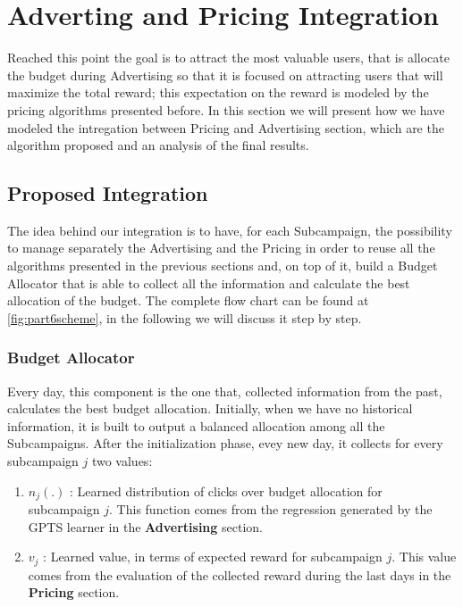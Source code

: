 \chapter{Adverting and Pricing Integration}

Reached this point the goal is to attract the most valuable users, that is allocate the budget during Advertising so that it is focused on attracting users that will maximize the total reward; this expectation on the reward is modeled by the pricing algorithms presented before. In this section we will present how we have modeled the intregation between Pricing and Advertising section, which are the algorithm proposed and an analysis of the final results.

\section{Proposed Integration}
The idea behind our integration is to have, for each Subcampaign, the possibility to manage separately the Advertising and the Pricing in order to reuse all the algorithms presented in the previous sections and, on top of it, build a Budget Allocator that is able to collect all the information and calculate the best allocation of the budget. The complete flow chart can be found at \ref{fig:part6scheme}, in the following we will discuss it step by step.

    \subsection{Budget Allocator}
    Every day, this component is the one that, collected information from the past, calculates the best budget allocation. Initially, when we have no historical information, it is built to output a balanced allocation among all the Subcampaigns. After the initialization phase, evey new day, it collects for every subcampaign $ j $ two values:
    
    \begin{enumerate}
        \item $ n_j (.) $ : Learned distribution of clicks over budget allocation for subcampaign $ j $. This function comes from the regression generated by the GPTS learner in the   \textbf{Advertising} section.
        \item $ v_j $ : Learned value, in terms of expected reward for subcampaign $ j $. This value comes from the evaluation of the collected reward during the last days in the \textbf{Pricing} section.
    \end{enumerate} 


